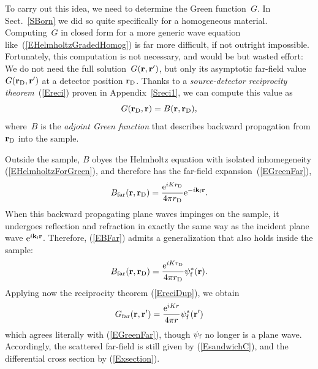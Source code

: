 To carry out this idea, we need to determine the Green function~$G$.
%
In Sect.~\ref{SBorn} we did so quite specifically
for a homogeneous material.
Computing~$G$ in closed form for a more generic wave equation
like~(\ref{EHelmholtzGradedHomog}) is far more difficult,
if not outright impossible.
Fortunately, this computation is not necessary,
and would be but wasted effort:
We do not need the full solution~$G(\mathbf{r},\mathbf{r}')$,
but only its asymptotic far-field value $G(\mathbf{r}_\text{D},\mathbf{r}')$
at a detector position $\mathbf{r}_\text{D}$.
%
Thanks to a \textit{source-detector reciprocity theorem}~(\ref{Ereci})
%
proven in Appendix~\ref{Sreci1},
we can compute this value
as
\begin{equation}\label{EreciDup}
  G(\mathbf{r}_\text{D},\mathbf{r}) = B(\mathbf{r},\mathbf{r}_\text{D}),
\end{equation}
where~$B$ is the \textit{adjoint Green function}
that describes backward propagation from $\mathbf{r}_\text{D}$ into the sample.

Outside the sample,
$B$ obyes the Helmholtz equation
with isolated inhomegeneity (\ref{EHelmholtzForGreen}),
and therefore has the far-field expansion~(\ref{EGreenFar}),
%
\begin{equation}\label{EBFar}
  B_\text{far}(\mathbf{r},\mathbf{r}_\text{D})
  =\frac{\text{e}^{iKr_\text{D}}}{4\pi r_\text{D}}\text{e}^{-i\mathbf{k}_{\text{f}} \mathbf{r}}.
\end{equation}
When this backward propagating plane waves impinges on the sample,
it undergoes reflection and refraction in exactly the same way as
the incident plane wave $\text{e}^{i\mathbf{k}_{\text{i}}\mathbf{r}}$.
Therefore,
 (\ref{EBFar}) admits a generalization that also holds inside the sample:
\begin{equation}\label{EBFull}
  B_\text{far}(\mathbf{r},\mathbf{r}_\text{D})
  = \frac{\text{e}^{iKr_\text{D}}}{4\pi r_\text{D}}\psi^*_{\text{f}}(\mathbf{r}).
\end{equation}
Applying now the reciprocity theorem (\ref{EreciDup}),
we obtain
\begin{equation}\label{EGreenFarDWBA}
  G_\text{far}(\mathbf{r},\mathbf{r}')
  = \frac{\text{e}^{iKr}}{4\pi r}\psi^*_{\text{f}}(\mathbf{r}')
\end{equation}
which agrees literally with (\ref{EGreenFar}),
though $\psi_{\text{f}}$ no longer is a plane wave.
Accordingly,
the scattered far-field is still given by (\ref{EsandwichC}),
and the differential cross section by (\ref{Exsection}).


